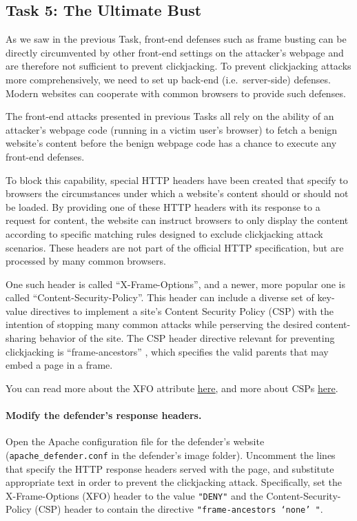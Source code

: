 
\subsection{Task 5: The Ultimate Bust}
As we saw in the previous Task, front-end defenses such as frame busting
can be directly circumvented by other front-end settings on the
attacker's webpage and are therefore not sufficient to prevent
clickjacking. To prevent clickjacking attacks more comprehensively, we
need to set up back-end (i.e.\ server-side) defenses.  Modern websites
can cooperate with common browsers to provide such defenses.

The front-end attacks presented in previous Tasks all rely on the
ability of an attacker's webpage code (running in a victim user's
browser) to fetch a benign website's content before the benign webpage
code has a chance to execute any front-end defenses. 

To block this capability, special HTTP headers have
been created that specify to browsers the 
circumstances under which a website's content should or should not be loaded.
By providing one of these HTTP headers with its response to a
request for content, the website can instruct
browsers to only display the content according to specific matching
rules designed to exclude clickjacking attack scenarios.
These headers are not part of the official HTTP specification,
but are processed by many common browsers.

One such header is called ``X-Frame-Options'',
and a newer, more popular one is called ``Content-Security-Policy''. 
This header can
include a diverse set of key-value directives to implement a site's Content Security
Policy (CSP) with the intention of stopping many common attacks while
perserving the desired content-sharing behavior of the site.  The CSP header
directive relevant for preventing clickjacking is ``frame-ancestors'' ,
which specifies the valid parents that may embed a page in a frame.

You can read more about the XFO attribute
\underline{\href{https://developer.mozilla.org/en-US/docs/Web/HTTP/Headers/X-Frame-Options}{here}},
and more about CSPs
\underline{\href{https://developer.mozilla.org/en-US/docs/Web/HTTP/CSP}{here}}.

\paragraph{Modify the defender's response headers.} Open the Apache
configuration file for the defender's website
(\texttt{apache\_defender.conf} in the defender's image folder).
Uncomment the lines that specify the HTTP response headers served with
the page, and substitute appropriate text in order to prevent the
clickjacking attack.  Specifically, set the X-Frame-Options (XFO) header
to the value \texttt{"DENY"} and the Content-Security-Policy (CSP)
header to contain the directive \texttt{"frame-ancestors `none' "}.

